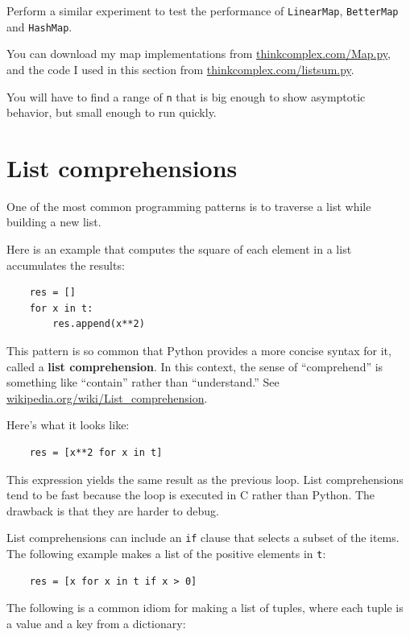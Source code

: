 \documentclass[10pt]{book}
\begin{document}
\begin{ex}

Perform a similar experiment to test the performance of
{\tt LinearMap}, {\tt BetterMap} and {\tt HashMap}.

You can download my map implementations from
\url{thinkcomplex.com/Map.py}, and the code I used in this section
from \url{thinkcomplex.com/listsum.py}.

You will have to find a range
of {\tt n} that is big enough to show asymptotic behavior, but small
enough to run quickly.

\end{ex}


\section{List comprehensions}

One of the most common programming patterns is to traverse
a list while building a new list.

Here is an example that computes the square of each element in
a list accumulates the results:

\begin{verbatim}
    res = []
    for x in t:
        res.append(x**2)
\end{verbatim}

This pattern is so common that Python provides a more
concise syntax for it, called a {\bf list comprehension}.
In this context, the sense of ``comprehend'' is something
  like ``contain'' rather than ``understand.''  See
  \url{wikipedia.org/wiki/List_comprehension}.

Here's what it looks like:

\begin{verbatim}
    res = [x**2 for x in t]
\end{verbatim}

This expression yields the same result as the previous loop.  List
comprehensions tend to be fast because the loop is executed in C
rather than Python.  The drawback is that they are harder to debug.

List comprehensions can include an {\tt if} clause that selects a
subset of the items.  The following example makes a
list of the positive elements in {\tt t}:

\begin{verbatim}
    res = [x for x in t if x > 0]
\end{verbatim}

The following is a common idiom for making a list of tuples, where
each tuple is a value and a key from a dictionary:
\end{document}
